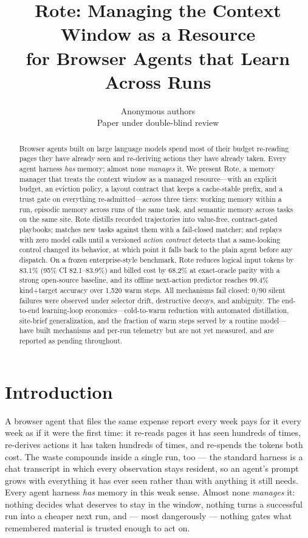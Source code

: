 \documentclass{article} %
\title{Rote: Managing the Context Window as a Resource \\ for Browser Agents that Learn Across Runs}
\author{Anonymous authors \\ Paper under double-blind review}
\newcommand{\campaignresult}[1]{}
\newcommand{\campaignpending}{The end-to-end learning-loop economics---cold-to-warm
reduction with automated distillation, site-brief generalization, and the fraction of
warm steps served by a routine model---have built mechanisms and per-run telemetry but
are not yet measured, and are reported as pending throughout.}
\begin{document}
\maketitle

\begin{abstract}
Browser agents built on large language models spend most of their budget re-reading pages they have already seen and re-deriving actions they have already taken. Every agent harness \emph{has} memory; almost none \emph{manages} it. We present Rote, a memory manager that treats the context window as a managed resource---with an explicit budget, an eviction policy, a layout contract that keeps a cache-stable prefix, and a trust gate on everything re-admitted---across three tiers: working memory within a run, episodic memory across runs of the same task, and semantic memory across tasks on the same site. Rote distills recorded trajectories into value-free, contract-gated playbooks; matches new tasks against them with a fail-closed matcher; and replays with zero model calls until a versioned \emph{action contract} detects that a same-looking control changed its behavior, at which point it falls back to the plain agent before any dispatch. On a frozen enterprise-style benchmark, Rote reduces logical input tokens by 83.1\% (95\% CI 82.1--83.9\%) and billed cost by 68.2\% at exact-oracle parity with a strong open-source baseline, and its offline next-action predictor reaches 99.4\% kind+target accuracy over 1{,}520 warm steps. All mechanisms fail closed: 0/90 silent failures were observed under selector drift, destructive decoys, and ambiguity. \campaignpending{}\campaignresult{Replace this call with the campaign's headline number once collected.}
\end{abstract}

\section{Introduction}
\label{sec:intro}

A browser agent that files the same expense report every week pays for it every week as
if it were the first time: it re-reads pages it has seen hundreds of times, re-derives
actions it has taken hundreds of times, and re-spends the tokens both cost. The waste
compounds inside a single run, too --- the standard harness is a chat transcript in
which every observation stays resident, so an agent's prompt grows with everything it
has ever seen rather than with anything it still needs. Every agent harness \emph{has}
memory in this weak sense. Almost none \emph{manages} it: nothing decides what deserves
to stay in the window, nothing turns a successful run into a cheaper next run, and ---
most dangerously --- nothing gates what remembered material is trusted enough to act on.
\end{document}
